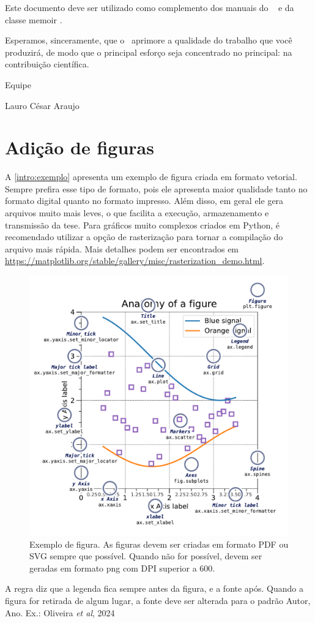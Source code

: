 Este documento deve ser utilizado como complemento dos manuais do \abnTeX\ \cite{abntex2classe,abntex2cite,abntex2cite-alf} e da classe \textsf{memoir} \cite{memoir}. 

Esperamos, sinceramente, que o \abnTeX\ aprimore a qualidade do trabalho que você produzirá, de modo que o principal esforço seja concentrado no principal: na contribuição científica.

Equipe \abnTeX 

Lauro César Araujo

	\section{Adição de figuras}
	
	A \autoref{intro:exemplo} apresenta um exemplo de figura criada em formato vetorial. Sempre prefira esse tipo de formato, pois ele apresenta maior qualidade tanto no formato digital quanto no formato impresso. Além disso, em geral ele gera arquivos muito mais leves, o que facilita a execução, armazenamento e transmissão da tese. Para gráficos muito complexos criados em Python, é recomendado utilizar a opção de rasterização para tornar a compilação do arquivo mais rápida. Mais detalhes podem ser encontrados em \url{https://matplotlib.org/stable/gallery/misc/rasterization_demo.html}.
		
	\begin{figure}[!h]
		\centering
		\caption{Exemplo de figura. As figuras devem ser criadas em formato PDF ou SVG sempre que possível. Quando não for possível, devem ser geradas em formato png com DPI superior a 600.}
		\label{intro:exemplo}
		\includegraphics[width=0.8\linewidth]{capitulos/figuras/intro/figure_intro}
	\end{figure}
	
	A regra diz que a legenda fica sempre antes da figura, e a fonte após. Quando a figura for retirada de algum lugar, a fonte deve ser alterada para o padrão Autor, Ano. Ex.: Oliveira \textit{et al}, 2024
	
	


			